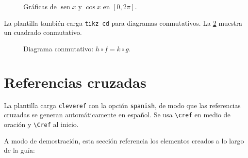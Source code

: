 \documentclass[letterpaper, 11pt]{article}
\DeclareMathOperator{\sen}{sen}
\begin{document}
\begin{figure}[ht]
    \centering
    \caption{Gráficas de $\sen x$ y $\cos x$ en $[0, 2\pi]$.}
    \label{fig:seno}
\end{figure}

La plantilla también carga \texttt{tikz-cd} para diagramas
conmutativos. La \cref{fig:diagrama} muestra un cuadrado conmutativo.

\begin{figure}[ht]
    \centering
    \caption{Diagrama conmutativo: $h \circ f = k \circ g$.}
    \label{fig:diagrama}
\end{figure}

\section{Referencias cruzadas}\label{sec:referencias}

La plantilla carga \texttt{cleveref} con la opción \texttt{spanish},
de modo que las referencias cruzadas se generan automáticamente en
español. Se usa \verb|\cref| en medio de oración y \verb|\Cref| al
inicio.

A modo de demostración, esta sección referencia los elementos creados
a lo largo de la guía:
\end{document}
